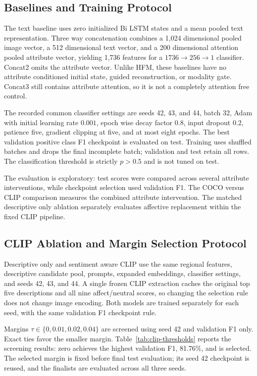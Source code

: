 \documentclass[conference]{IEEEtran}
\begin{document}
\subsection{Baselines and Training Protocol}
The text baseline uses zero initialized Bi LSTM states and a mean pooled text representation. Three way concatenation combines a 1,024 dimensional pooled image vector, a 512 dimensional text vector, and a 200 dimensional attention pooled attribute vector, yielding 1,736 features for a $1736\rightarrow256\rightarrow1$ classifier. Concat2 omits the attribute vector. Unlike HFM, these baselines have no attribute conditioned initial state, guided reconstruction, or modality gate. Concat3 still contains attribute attention, so it is not a completely attention free control. 

The recorded common classifier settings are seeds 42, 43, and 44, batch 32, Adam with initial learning rate $0.001$, epoch wise decay factor 0.8, input dropout 0.2, patience five, gradient clipping at five, and at most eight epochs. The best validation positive class F1 checkpoint is evaluated on test. Training uses shuffled batches and drops the final incomplete batch; validation and test retain all rows. The classification threshold is strictly $p>0.5$ and is not tuned on test.

The evaluation is exploratory: test scores were compared across several attribute interventions, while checkpoint selection used validation F1. The COCO versus CLIP comparison measures the combined attribute intervention. The matched descriptive only ablation separately evaluates affective replacement within the fixed CLIP pipeline.

\subsection{CLIP Ablation and Margin Selection Protocol}
Descriptive only and sentiment aware CLIP use the same regional features, descriptive candidate pool, prompts, expanded embeddings, classifier settings, and seeds 42, 43, and 44. A single frozen CLIP extraction caches the original top five descriptions and all nine affect/neutral scores, so changing the selection rule does not change image encoding. Both models are trained separately for each seed, with the same validation F1 checkpoint rule.

Margins $\tau\in\{0,0.01,0.02,0.04\}$ are screened using seed 42 and validation F1 only. Exact ties favor the smaller margin. Table~\ref{tab:clip-thresholds} reports the screening results: zero achieves the highest validation F1, 81.76\%, and is selected. The selected margin is fixed before final test evaluation; its seed 42 checkpoint is reused, and the finalists are evaluated across all three seeds. 
\end{document}
